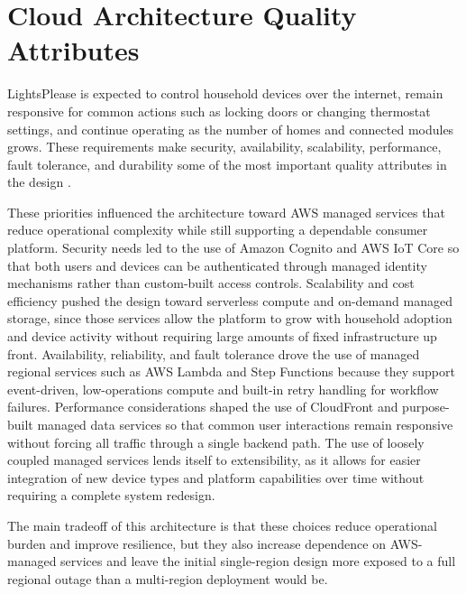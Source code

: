 \section{Cloud Architecture Quality Attributes}

LightsPlease is expected to control household devices over the internet, remain responsive for common actions such as locking doors or changing thermostat settings, and continue operating as the number of homes and connected modules grows. These requirements make security, availability, scalability, performance, fault tolerance, and durability some of the most important quality attributes in the design \cite{cloud_computing}.

These priorities influenced the architecture toward AWS managed services that reduce operational complexity while still supporting a dependable consumer platform. Security needs led to the use of Amazon Cognito and AWS IoT Core so that both users and devices can be authenticated through managed identity mechanisms rather than custom-built access controls. Scalability and cost efficiency pushed the design toward serverless compute and on-demand managed storage, since those services allow the platform to grow with household adoption and device activity without requiring large amounts of fixed infrastructure up front. Availability, reliability, and fault tolerance drove the use of managed regional services such as AWS Lambda and Step Functions because they support event-driven, low-operations compute and built-in retry handling for workflow failures. Performance considerations shaped the use of CloudFront and purpose-built managed data services so that common user interactions remain responsive without forcing all traffic through a single backend path. The use of loosely coupled managed services lends itself to extensibility, as it allows for easier integration of new device types and platform capabilities over time without requiring a complete system redesign. 

The main tradeoff of this architecture is that these choices reduce operational burden and improve resilience, but they also increase dependence on AWS-managed services and leave the initial single-region design more exposed to a full regional outage than a multi-region deployment would be.